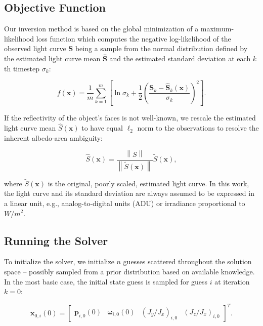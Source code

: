 \documentclass[a4paper,twocolumn]{spaceDebrisC} %
\newcommand{\vctr}[1]{\bm{#1}}
\newcommand{\norm}[1]{\left\lVert#1\right\rVert}
\begin{document}
\subsection{Objective Function}

Our inversion method is based on the global minimization of a maximum-likelihood loss function which computes the negative log-likelihood of the observed light curve $\vctr{S}$ being a sample from the normal distribution defined by the estimated light curve mean $\hat{\vctr{S}}$ and the estimated standard deviation at each $k$th timestep $\sigma_k$:

\begin{equation} \label{eq:nll_loss}
 f(\vctr{x}) = \frac{1}{m}\sum_{k=1}^{m}\left[\ln\sigma_k + \frac{1}{2}\left(\frac{\vctr{S}_k - \hat{\vctr{S}}_k(\vctr{x})}{\sigma_k}\right)^2 \right].
 \end{equation}

If the reflectivity of the object's faces is not well-known, we rescale the estimated light curve mean $\hat{S}(\vctr{x})$ to have equal $\ell_2$ norm to the observations to resolve the inherent albedo-area ambiguity:

\begin{equation}
 \hat{S}(\vctr{x}) = \frac{\norm{S}}{\norm{\tilde{S}(\vctr{x})}} \tilde{S}(\vctr{x}),
\end{equation}

\noindent
where $\tilde{S}(\vctr{x})$ is the original, poorly scaled, estimated light curve. In this work, the light curve and its standard deviation are always assumed to be expressed in a linear unit, e.g., analog-to-digital units (ADU) or irradiance proportional to $W/m^2$.

\subsection{Running the Solver} \label{sec:run_solver}

To initialize the solver, we initialize $n$ guesses scattered throughout the solution space -- possibly sampled from a prior distribution based on available knowledge. In the most basic case, the initial state guess is sampled for guess $i$ at iteration $k=0$:

\begin{equation}
 \vctr{x}_{0,i}(0) = \begin{bmatrix}\vctr{p}_{i,0}(0) & \vctr{\omega}_{i,0}(0) & \left(J_y / J_x\right)_{i,0} & \left(J_z / J_x\right)_{i,0}\end{bmatrix}^T.
\end{equation}
\end{document}
